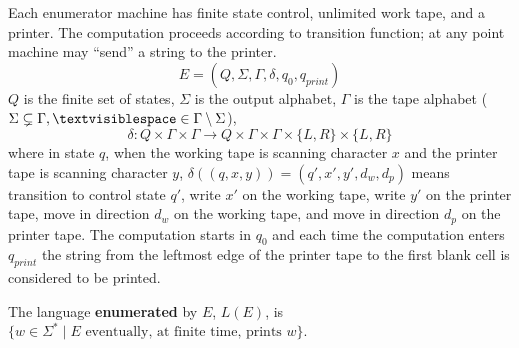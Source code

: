 \documentclass[12pt, oneside]{article}
\begin{document}
Each enumerator machine has finite state control, unlimited work tape, and a printer. The computation proceeds
according to transition function; at any point machine may ``send'' a string to the printer.
\[
E  = (Q, \Sigma, \Gamma, \delta, q_0, q_{print})  
\]
$Q$ is the finite set of states, $\Sigma$ is  the output alphabet, $\Gamma$ is the 
tape alphabet ($\Sigma  \subsetneq\Gamma, 
\textvisiblespace \in \Gamma \setminus \Sigma$), 
\[
\delta:  Q  \times  \Gamma \times \Gamma \to  Q \times  \Gamma \times  \Gamma \times \{L, R\} \times  \{L, R\}
\]
where in state $q$, when the working tape is scanning character $x$ and the printer tape is scanning character $y$,
$\delta( (q,x,y) ) = (q', x', y', d_w, d_p)$ means transition to control state $q'$, write $x'$ on 
the working tape, write $y'$ on the printer tape, move in direction $d_w$ on the working tape, and move in direction 
$d_p$ on the printer tape. The computation starts in $q_0$ and each time the computation enters $q_{print}$
the string from the leftmost edge of the printer tape to the first blank cell is considered to be printed.

The language  {\bf  enumerated} by  $E$, $L(E)$, is $\{ w \in \Sigma^* \mid \text{$E$ eventually, at finite  time, 
prints $w$} \}$.
\end{document}

